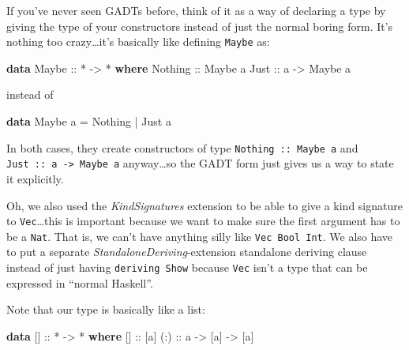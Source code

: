 \documentclass[]{article}
\newenvironment{Shaded}{}{}
\newcommand{\DataTypeTok}[1]{\textcolor[rgb]{0.56,0.13,0.00}{#1}}
\newcommand{\KeywordTok}[1]{\textcolor[rgb]{0.00,0.44,0.13}{\textbf{#1}}}
\newcommand{\NormalTok}[1]{#1}
\newcommand{\OperatorTok}[1]{\textcolor[rgb]{0.40,0.40,0.40}{#1}}
\newcommand{\OtherTok}[1]{\textcolor[rgb]{0.00,0.44,0.13}{#1}}
\begin{document}
If you've never seen GADTs before, think of it as a way of declaring a type by
giving the type of your constructors instead of just the normal boring form.
It's nothing too crazy\ldots it's basically like defining \texttt{Maybe} as:

\begin{Shaded}
\begin{Highlighting}[]
\KeywordTok{data} \DataTypeTok{Maybe}\OtherTok{ ::} \OperatorTok{*} \OtherTok{{-}>} \OperatorTok{*} \KeywordTok{where}
    \DataTypeTok{Nothing}\OtherTok{ ::} \DataTypeTok{Maybe}\NormalTok{ a}
    \DataTypeTok{Just}\OtherTok{    ::}\NormalTok{ a }\OtherTok{{-}>} \DataTypeTok{Maybe}\NormalTok{ a}
\end{Highlighting}
\end{Shaded}

instead of

\begin{Shaded}
\begin{Highlighting}[]
\KeywordTok{data} \DataTypeTok{Maybe}\NormalTok{ a }\OtherTok{=} \DataTypeTok{Nothing} \OperatorTok{|} \DataTypeTok{Just}\NormalTok{ a}
\end{Highlighting}
\end{Shaded}

In both cases, they create constructors of type \texttt{Nothing\ ::\ Maybe\ a}
and \texttt{Just\ ::\ a\ -\textgreater{}\ Maybe\ a} anyway\ldots so the GADT
form just gives us a way to state it explicitly.

Oh, we also used the \emph{KindSignatures} extension to be able to give a kind
signature to \texttt{Vec}\ldots this is important because we want to make sure
the first argument has to be a \texttt{Nat}. That is, we can't have anything
silly like \texttt{Vec\ Bool\ Int}. We also have to put a separate
\emph{StandaloneDeriving}-extension standalone deriving clause instead of just
having \texttt{deriving\ Show} because \texttt{Vec} isn't a type that can be
expressed in ``normal Haskell''.

Note that our type is basically like a list:

\begin{Shaded}
\begin{Highlighting}[]
\KeywordTok{data}\NormalTok{ []}\OtherTok{ ::} \OperatorTok{*} \OtherTok{{-}>} \OperatorTok{*} \KeywordTok{where}
\NormalTok{    []}\OtherTok{  ::}\NormalTok{ [a]}
\OtherTok{    (:) ::}\NormalTok{ a }\OtherTok{{-}>}\NormalTok{ [a] }\OtherTok{{-}>}\NormalTok{ [a]}
\end{Highlighting}
\end{Shaded}
\end{document}
